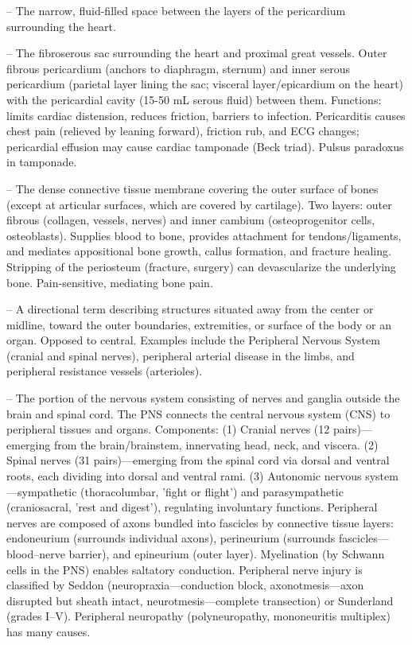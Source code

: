-- The narrow, fluid-filled space between the layers of the pericardium surrounding the heart.

-- The fibroserous sac surrounding the heart and proximal great vessels. Outer fibrous pericardium (anchors to diaphragm, sternum) and inner serous pericardium (parietal layer lining the sac; visceral layer/epicardium on the heart) with the pericardial cavity (15-50 mL serous fluid) between them. Functions: limits cardiac distension, reduces friction, barriers to infection. Pericarditis causes chest pain (relieved by leaning forward), friction rub, and ECG changes; pericardial effusion may cause cardiac tamponade (Beck triad). Pulsus paradoxus in tamponade.

-- The dense connective tissue membrane covering the outer surface of bones (except at articular surfaces, which are covered by cartilage). Two layers: outer fibrous (collagen, vessels, nerves) and inner cambium (osteoprogenitor cells, osteoblasts). Supplies blood to bone, provides attachment for tendons/ligaments, and mediates appositional bone growth, callus formation, and fracture healing. Stripping of the periosteum (fracture, surgery) can devascularize the underlying bone. Pain-sensitive, mediating bone pain.

-- A directional term describing structures situated away from the center or midline, toward the outer boundaries, extremities, or surface of the body or an organ. Opposed to central. Examples include the Peripheral Nervous System (cranial and spinal nerves), peripheral arterial disease in the limbs, and peripheral resistance vessels (arterioles).

-- The portion of the nervous system consisting of nerves and ganglia outside the brain and spinal cord. The PNS connects the central nervous system (CNS) to peripheral tissues and organs. Components: (1) Cranial nerves (12 pairs)—emerging from the brain/brainstem, innervating head, neck, and viscera. (2) Spinal nerves (31 pairs)—emerging from the spinal cord via dorsal and ventral roots, each dividing into dorsal and ventral rami. (3) Autonomic nervous system—sympathetic (thoracolumbar, 'fight or flight') and parasympathetic (craniosacral, 'rest and digest'), regulating involuntary functions. Peripheral nerves are composed of axons bundled into fascicles by connective tissue layers: endoneurium (surrounds individual axons), perineurium (surrounds fascicles—blood–nerve barrier), and epineurium (outer layer). Myelination (by Schwann cells in the PNS) enables saltatory conduction. Peripheral nerve injury is classified by Seddon (neuropraxia—conduction block, axonotmesis—axon disrupted but sheath intact, neurotmesis—complete transection) or Sunderland (grades I--V). Peripheral neuropathy (polyneuropathy, mononeuritis multiplex) has many causes.

